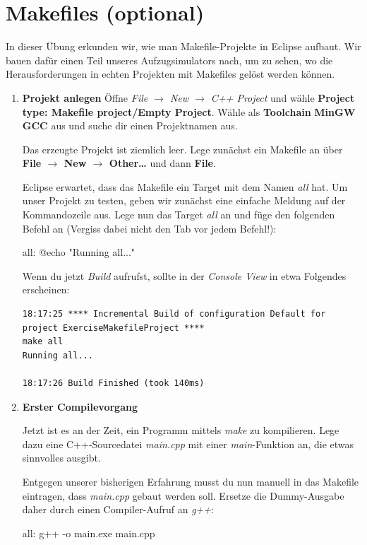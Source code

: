 \section{Makefiles (optional)}

In dieser Übung erkunden wir, wie man Makefile-Projekte in Eclipse aufbaut.
Wir bauen dafür einen Teil unseres Aufzugsimulators nach, um zu sehen, wo die Herausforderungen in echten Projekten mit Makefiles gelöst werden können.

\begin{enumerate}
\item\textbf{Projekt anlegen}
Öffne \emph{File $\to$ New $\to$ C++ Project} und wähle \textbf{Project type: Makefile project/Empty Project}.
Wähle als \textbf{Toolchain} \textbf{MinGW GCC} aus und suche dir einen Projektnamen aus.

Das erzeugte Projekt ist ziemlich leer.
Lege zunächst ein Makefile an über \textbf{File $\to$ New $\to$ Other\dots} und dann \textbf{File}.

Eclipse erwartet, dass das Makefile ein Target mit dem Namen \emph{all} hat.
Um unser Projekt zu testen, geben wir zunächst eine einfache Meldung auf der Kommandozeile aus.
Lege nun das Target \emph{all} an und füge den folgenden Befehl an (Vergiss dabei nicht den Tab vor jedem Befehl!):
\begin{lstmake}
all:	
	@echo "Running all..."
\end{lstmake}

Wenn du jetzt \emph{Build} aufrufst, sollte in der \emph{Console View} in etwa Folgendes erscheinen:
\begin{verbatim}
18:17:25 **** Incremental Build of configuration Default for project ExerciseMakefileProject ****
make all 
Running all...

18:17:26 Build Finished (took 140ms)
\end{verbatim}

\item\textbf{Erster Compilevorgang}

Jetzt ist es an der Zeit, ein Programm mittels \emph{make} zu kompilieren.
Lege dazu eine C++-Sourcedatei \emph{main.cpp} mit einer \emph{main}-Funktion an, die etwas sinnvolles ausgibt.

Entgegen unserer bisherigen Erfahrung musst du nun manuell in das Makefile eintragen, dass \emph{main.cpp} gebaut werden soll.
Ersetze die Dummy-Ausgabe daher durch einen Compiler-Aufruf an \emph{g++}:
\begin{lstmake}
all:
	g++ -o main.exe main.cpp
\end{lstmake}


\end{enumerate}
